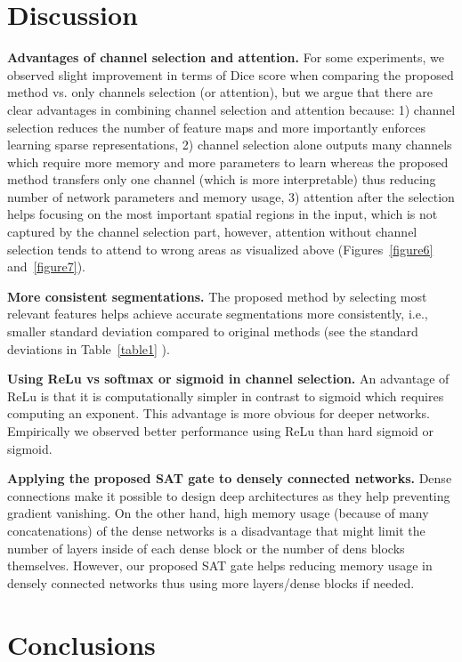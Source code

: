 \documentclass{article}
\begin{document}
\section{Discussion}
\label{sec:blind}
\textbf{Advantages of channel selection and attention.} For some experiments, we observed slight improvement in terms of Dice score when comparing the proposed method vs. only channels selection (or attention), but we argue that there are clear advantages in combining channel selection and attention because: 1) channel selection reduces the number of feature maps and more importantly enforces learning sparse representations, 2) channel selection alone outputs many channels which require more memory and more parameters to learn whereas the proposed method transfers only one channel (which is more interpretable) thus reducing number of network parameters and memory usage, 3) attention after the selection helps focusing on the most important spatial regions in the input, which is not captured by the channel selection part, however, attention without channel selection tends to attend to wrong areas as visualized above (Figures~\ref{figure6} and~\ref{figure7}). 

\noindent \textbf{More consistent segmentations.} The proposed method by selecting most relevant features helps achieve accurate segmentations more consistently, i.e., smaller standard deviation compared to original methods (see the standard deviations in Table~\ref{table1} ).

\noindent \textbf{Using ReLu vs softmax or sigmoid in channel selection.} An advantage of ReLu is that it is computationally simpler in contrast to sigmoid which requires computing an exponent. This advantage is more obvious for deeper networks. Empirically we observed better performance using ReLu than hard sigmoid or sigmoid. 


\noindent \textbf{Applying the proposed SAT gate to densely connected networks.} Dense connections make it possible to design deep architectures as they help preventing gradient vanishing. On the other hand, high memory usage (because of many concatenations) of the dense networks is a disadvantage that might limit the number of layers inside of each dense block or the number of dens blocks themselves. However, our proposed SAT gate helps reducing memory usage in densely connected networks thus using more layers/dense blocks if needed.     


\section{Conclusions}
\end{document}
